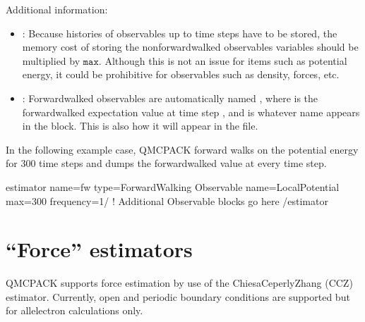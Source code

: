 \documentclass[letterpaper,10pt,english]{sphinxmanual}
\begin{document}
Additional information:
\begin{itemize}
\item {} 
: Because histories of observables up to  time steps
have to be stored, the memory cost of storing the nonforward\sphinxhyphen{}walked
observables variables should be multiplied by \(\texttt{max}\).
Although this is not an issue for items such as potential energy, it
could be prohibitive for observables such as density, forces, etc.

\item {} 
: Forward\sphinxhyphen{}walked observables are automatically
named , where  is the forward\sphinxhyphen{}walked expectation
value at time step , and  is whatever name appears in
the  block. This is also how it will appear in the
 file.

\end{itemize}

In the following example case, QMCPACK forward walks on the potential
energy for 300 time steps and dumps the forward\sphinxhyphen{}walked value at every
time step.
\def\sphinxLiteralBlockLabel{\label{\detokenize{hamiltonianobservable:listing-41}}}
\begin{sphinxVerbatim}[commandchars=\\\{\}]
\PYGZlt{}estimator name=\PYGZdq{}fw\PYGZdq{} type=\PYGZdq{}ForwardWalking\PYGZdq{}\PYGZgt{}
    \PYGZlt{}Observable name=\PYGZdq{}LocalPotential\PYGZdq{} max=\PYGZdq{}300\PYGZdq{} frequency=\PYGZdq{}1\PYGZdq{}/\PYGZgt{}
     \PYGZlt{}!\PYGZhy{}\PYGZhy{}\PYGZhy{} Additional Observable blocks go here \PYGZhy{}\PYGZhy{}\PYGZgt{}
 \PYGZlt{}/estimator\PYGZgt{}
\end{sphinxVerbatim}


\section{“Force” estimators}
\label{\detokenize{hamiltonianobservable:force-estimators}}\label{\detokenize{hamiltonianobservable:force-est}}
QMCPACK supports force estimation by use of the Chiesa\sphinxhyphen{}Ceperly\sphinxhyphen{}Zhang
(CCZ) estimator. Currently, open and periodic boundary conditions are
supported but for all\sphinxhyphen{}electron calculations only.
\end{document}
